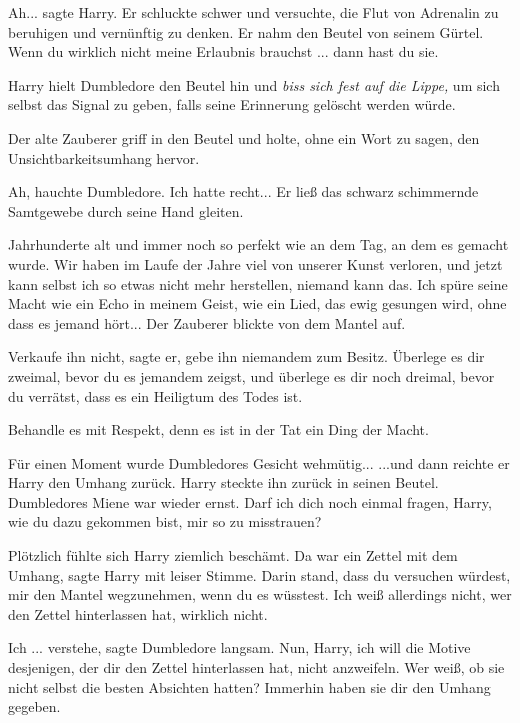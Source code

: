 \glqq Ah...\grqq{} sagte Harry. Er schluckte schwer und versuchte, die Flut von
Adrenalin zu beruhigen und vernünftig zu denken. Er nahm den Beutel von seinem
Gürtel. \glqq Wenn du wirklich nicht meine Erlaubnis brauchst ... dann hast du
sie.\grqq{}

Harry hielt Dumbledore den Beutel hin und \emph{biss sich fest auf die Lippe,}
um sich selbst das Signal zu geben, falls seine Erinnerung gelöscht werden
würde.

Der alte Zauberer griff in den Beutel und holte, ohne ein Wort zu sagen, den
Unsichtbarkeitsumhang hervor.

\glqq Ah\grqq{}, hauchte Dumbledore. \glqq Ich hatte recht...\grqq{} Er ließ das
schwarz schimmernde Samtgewebe durch seine Hand gleiten.

\glqq Jahrhunderte alt und immer noch so perfekt wie an dem Tag, an dem es
gemacht wurde. Wir haben im Laufe der Jahre viel von unserer Kunst verloren, und
jetzt kann selbst ich so etwas nicht mehr herstellen, niemand kann das. Ich
spüre seine Macht wie ein Echo in meinem Geist, wie ein Lied, das ewig gesungen
wird, ohne dass es jemand hört...\grqq{} Der Zauberer blickte von dem Mantel
auf.

\glqq Verkaufe ihn nicht\grqq{}, sagte er, \glqq gebe ihn niemandem zum Besitz.
Überlege es dir zweimal, bevor du es jemandem zeigst, und überlege es dir noch
dreimal, bevor du verrätst, dass es ein Heiligtum des Todes ist.

Behandle es mit Respekt, denn es ist in der Tat ein Ding der Macht.\grqq{}

Für einen Moment wurde Dumbledores Gesicht wehmütig... ...und dann reichte er
Harry den Umhang zurück. Harry steckte ihn zurück in seinen Beutel. Dumbledores
Miene war wieder ernst. \glqq Darf ich dich noch einmal fragen, Harry, wie du
dazu gekommen bist, mir so zu misstrauen?\grqq{}

Plötzlich fühlte sich Harry ziemlich beschämt. \glqq Da war ein Zettel mit dem
Umhang\grqq{}, sagte Harry mit leiser Stimme. \glqq Darin stand, dass du
versuchen würdest, mir den Mantel wegzunehmen, wenn du es wüsstest. Ich weiß
allerdings nicht, wer den Zettel hinterlassen hat, wirklich nicht.\grqq{}

\glqq Ich ... verstehe\grqq{}, sagte Dumbledore langsam. \glqq Nun, Harry, ich
will die Motive desjenigen, der dir den Zettel hinterlassen hat, nicht
anzweifeln. Wer weiß, ob sie nicht selbst die besten Absichten hatten? Immerhin
haben sie dir den Umhang gegeben.\grqq{}

